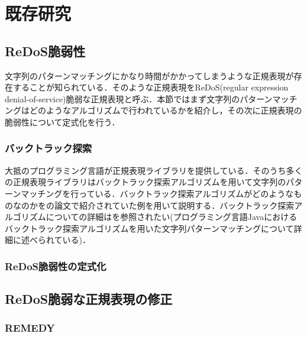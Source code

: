 \documentclass[a4paper, 12pt, dvipdfmx, uplatex]{jsreport}
\begin{document}
\chapter{既存研究}


\section{ReDoS脆弱性}
文字列のパターンマッチングにかなり時間がかかってしまうような正規表現が存在することが知られている．そのような正規表現をReDoS(regular expression denial-of-service)脆弱な正規表現と呼ぶ．本節ではまず文字列のパターンマッチングはどのようなアルゴリズムで行われているかを紹介し，その次に正規表現の脆弱性について定式化を行う．

\subsection{バックトラック探索}
大抵のプログラミング言語が正規表現ライブラリを提供している．そのうち多くの正規表現ライブラリはバックトラック探索アルゴリズムを用いて文字列のパターンマッチングを行っている．バックトラック探索アルゴリズムがどのようなものなのかを\cite{javascript}の論文で紹介されていた例を用いて説明する．バックトラック探索アルゴリズムについての詳細は\cite{java}を参照されたい(プログラミング言語Javaにおけるバックトラック探索アルゴリズムを用いた文字列パターンマッチングについて詳細に述べられている)．

\subsection{ReDoS脆弱性の定式化}




\section{ReDoS脆弱な正規表現の修正}

\subsection{REMEDY}











\end{document}
